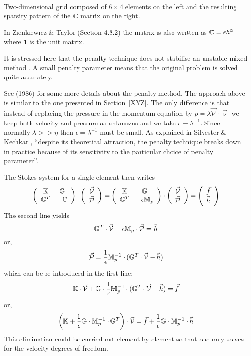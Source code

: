 \begin{center}
\\
{\captionfont Two-dimensional grid composed of $6\times 4$ elements
on the left and the resulting sparsity pattern of the ${\mathbb{C}}$ matrix 
on the right.}
\end{center}

In Zienkiewicz \& Taylor (Section 4.8.2) the matrix is also written as ${\mathbb{C}} = \epsilon h^2 {\bm 1} $ where ${\bm 1}$ is the unit matrix. 

It is stressed here that the penalty technique does not stabilise an  
unstable mixed method \cite{sike90}. A small penalty parameter 
means that the original problem is solved quite accurately.

See \textcite{cuss86} (1986) for some more details about the penalty method. The approach above is similar to the one presented in Section~\ref{XYZ}. The only difference is that instead of replacing the pressure in the momentum equation by $p = \lambda \vec\nabla\cdot\vec\upnu$ we keep both velocity and pressure
as unknowns and we take $\epsilon=\lambda^{-1}$. Since 
normally $\lambda >> \eta$ then $\epsilon=\lambda^{-1}$ must be small. 
As explained in Silvester \& Kechkar \cite{sike90}, 
``despite its theoretical attraction, the penalty
technique breaks down in practice because of its sensitivity to the particular choice of penalty parameter''.

The Stokes system for a single element then writes
\[
\left(
\begin{array}{cc}
{\mathbb{K}} & {\mathbb{G}} \\
{\mathbb{G}}^T & -{\mathbb{C}} 
\end{array}
\right)
\cdot
\left(
\begin{array}{c}
\vec{\cal V} \\
\vec{\cal P}
\end{array}
\right)
=
\left(
\begin{array}{cc}
{\mathbb{K}} & {\mathbb{G}} \\
{\mathbb{G}}^T & -\epsilon {\mathbb{M}}_p 
\end{array}
\right)
\cdot
\left(
\begin{array}{c}
\vec{\cal V} \\
\vec{\cal P}
\end{array}
\right)
=
\left(
\begin{array}{c}
\vec{f} \\
\vec{h}
\end{array}
\right)
\]
The second line yields
\[
{\mathbb{G}}^T \cdot \vec{\cal V} - \epsilon {\mathbb{M}}_p \cdot \vec{\cal P} = \vec{h}
\]
or, 
\[
\vec{\cal P} =\frac{1}{\epsilon} {\mathbb{M}}_p^{-1} \cdot( {\mathbb{G}}^T \cdot \vec{\cal V} -\vec{h})
\]
which can be re-introduced in the first line:
\[
{\mathbb{K}} \cdot \vec{\cal V} + {\mathbb{G}} \cdot \frac{1}{\epsilon} {\mathbb{M}}_p^{-1} \cdot( {\mathbb{G}}^T \cdot \vec{\cal V} -\vec{h}) = \vec{f}
\]
or, 
\[
\left( {\mathbb{K}} + \frac{1}{\epsilon} {\mathbb{G}}\cdot {\mathbb{M}}_p^{-1} \cdot {\mathbb{G}}^T
\right) \cdot \vec{\cal V} = \vec{f} +  \frac{1}{\epsilon}{\mathbb{G}} \cdot {\mathbb{M}}_p^{-1} \cdot \vec{h}
\]
This elimination could be carried out element by element so that one only
solves for the velocity degrees of freedom. 


